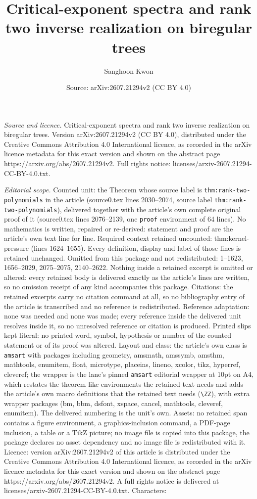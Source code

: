 \documentclass[10pt,a4paper]{amsart}
\title[Critical-exponent spectra and rank two inverse realization o]{Critical-exponent spectra and rank two inverse realization on biregular trees}
\author{Sanghoon Kwon}
\date{Source: arXiv:2607.21294v2 (CC BY 4.0)}
\begin{document}
\maketitle

\noindent\emph{Source and licence.} Critical-exponent spectra and rank two inverse realization on biregular trees. Version arXiv:2607.21294v2 (CC BY 4.0), distributed under the Creative Commons Attribution 4.0 International licence, as recorded in the arXiv licence metadata for this exact version and shown on the abstract page https://arxiv.org/abs/2607.21294v2. Full rights notice: licenses/arxiv-2607.21294-CC-BY-4.0.txt.\par\smallskip

\noindent\textit{Editorial scope.} Counted unit: the Theorem whose source label is \texttt{thm:rank-two-polynomials} in the article (source0.tex lines 2030--2074, source label \texttt{thm:rank-two-polynomials}), delivered together with the article's own complete original proof of it (source0.tex lines 2076--2139, one \texttt{proof} environment of 64 lines). No mathematics is written, repaired or re-derived: statement and proof are the article's own text line for line. Required context retained uncounted: thm:kernel-pressure (lines 1624--1655). Every definition, display and label of those lines is retained unchanged. Omitted from this package and not redistributed: 1--1623, 1656--2029, 2075--2075, 2140--2622. Nothing inside a retained excerpt is omitted or altered: every retained body is delivered exactly as the article's lines are written, so no omission receipt of any kind accompanies this package. Citations: the retained excerpts carry no citation command at all, so no bibliography entry of the article is transcribed and no reference is redistributed. Reference adaptation: none was needed and none was made; every reference inside the delivered unit resolves inside it, so no unresolved reference or citation is produced. Printed slips kept literal: no printed word, symbol, hypothesis or number of the counted statement or of its proof was altered. Layout and class: the article's own class is \texttt{amsart} with packages including geometry, amsmath, amssymb, amsthm, mathtools, enumitem, float, microtype, placeins, lineno, xcolor, tikz, hyperref, cleveref; the wrapper is the lane's pinned \texttt{amsart} editorial wrapper at 10pt on A4, which restates the theorem-like environments the retained text needs and adds the article's own macro definitions that the retained text needs (\texttt{\textbackslash ZZ}), with extra wrapper packages (bm, bbm, dsfont, xspace, cancel, mathtools, cleveref, enumitem). The delivered numbering is the unit's own. Assets: no retained span contains a figure environment, a graphics-inclusion command, a PDF-page inclusion, a table or a TikZ picture; no image file is copied into this package, the package declares no asset dependency and no image file is redistributed with it. Licence: version arXiv:2607.21294v2 of this article is distributed under the Creative Commons Attribution 4.0 International licence, as recorded in the arXiv licence metadata for this exact version and shown on the abstract page https://arxiv.org/abs/2607.21294v2. A full rights notice is delivered at licenses/arxiv-2607.21294-CC-BY-4.0.txt. Characters: 
\end{document}
